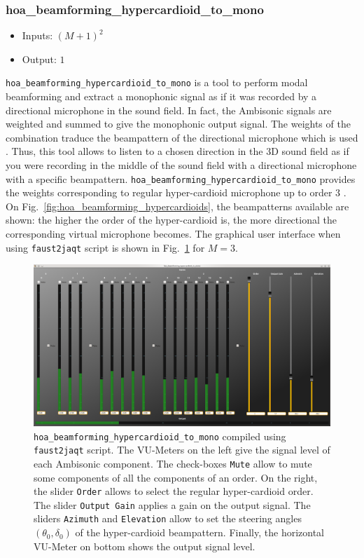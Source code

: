 \documentclass[10pt,a4paper]{article}
\begin{document}
\subsubsection{hoa\_beamforming\_hypercardioid\_to\_mono}
\begin{itemize}
\item Inputs: $(M+1)^2$
\item Output: $1$
\end{itemize}
\lstinline'hoa_beamforming_hypercardioid_to_mono' is a tool to perform modal beamforming and extract a monophonic signal as if it was recorded by a directional microphone in the sound field. In fact, the Ambisonic signals are weighted and summed to give the monophonic output signal. The weights of the combination traduce the beampattern of the directional microphone which is used \cite{meyer2002highly}. Thus, this tool allows to listen to a chosen direction in the 3D sound field as if you were recording in the middle of the sound field with a directional microphone with a specific beampattern. \lstinline'hoa_beamforming_hypercardioid_to_mono' provides the weights corresponding to regular hyper-cardioid microphone up to order $3$ \cite{meyer2002highly,lecomte2016filtrage}. On Fig.~\ref{fig:hoa_beamforming_hypercardioids}, the beampatterns available are shown: the higher the order of the hyper-cardioid is, the more directional the corresponding virtual microphone becomes. The graphical user interface when using \lstinline'faust2jaqt' script is shown in Fig.~\ref{fig:hoa_beamforming_hypercardioid_to_mono} for $M=3$.
\begin{figure}[!ht]
\centering
\includegraphics[width=\columnwidth]{hoa_beamforming_hypercardioid_to_mono.png}
\caption{\lstinline'hoa_beamforming_hypercardioid_to_mono' compiled using \lstinline'faust2jaqt' script. The VU-Meters on the left give the signal level of each Ambisonic component. The check-boxes \lstinline'Mute' allow to mute some components of all the components of an order. On the right, the slider \lstinline'Order' allows to select the regular hyper-cardioid order. The slider \lstinline'Output Gain' applies a gain on the output signal. The sliders \lstinline'Azimuth' and \lstinline'Elevation' allow to set the steering angles $(\theta_0,\delta_0)$ of the hyper-cardioid beampattern. Finally, the horizontal VU-Meter on bottom shows the output signal level.}
\label{fig:hoa_beamforming_hypercardioid_to_mono}
\end{figure}
\end{document}
